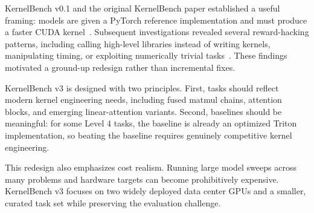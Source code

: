 KernelBench v0.1 and the original KernelBench paper established a useful framing: models are given a PyTorch reference implementation and must produce a faster CUDA kernel~\cite{kernelbench,stanford-kernelbenchv01}. Subsequent investigations revealed several reward-hacking patterns, including calling high-level libraries instead of writing kernels, manipulating timing, or exploiting numerically trivial tasks~\cite{metr2025}. These findings motivated a ground-up redesign rather than incremental fixes.

KernelBench v3 is designed with two principles. First, tasks should reflect modern kernel engineering needs, including fused matmul chains, attention blocks, and emerging linear-attention variants. Second, baselines should be meaningful: for some Level 4 tasks, the baseline is already an optimized Triton implementation, so beating the baseline requires genuinely competitive kernel engineering.

This redesign also emphasizes cost realism. Running large model sweeps across many problems and hardware targets can become prohibitively expensive. KernelBench v3 focuses on two widely deployed data center GPUs and a smaller, curated task set while preserving the evaluation challenge.
